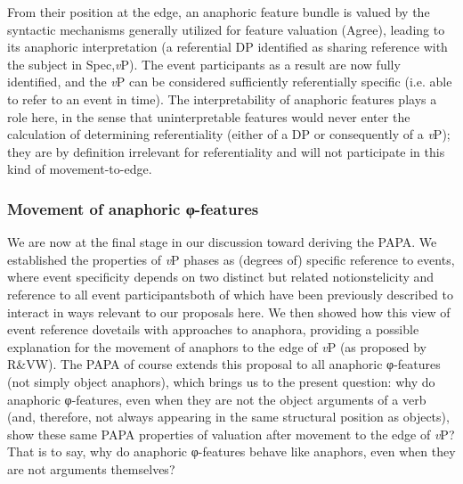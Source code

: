 \documentclass[output=paper
,modfonts
,nonflat
]{langsci/langscibook}
\begin{document}
From their position at the edge, an anaphoric feature bundle is valued by the syntactic mechanisms generally utilized for feature valuation (Agree), leading to its anaphoric interpretation (a referential DP identified as sharing reference with the subject in Spec,\textit{v}P). The event participants as a result are now fully identified, and the \textit{v}P can be considered sufficiently referentially specific (i.e. able to refer to an event in time). The interpretability of anaphoric features plays a role here, in the sense that uninterpretable features would never enter the calculation of determining referentiality (either of a DP or consequently of a \textit{v}P); they are by definition irrelevant for referentiality and will not participate in this kind of movement-to-edge.

\subsubsection{Movement of anaphoric φ-features}

We are now at the final stage in our discussion toward deriving the PAPA. We established the properties of \textit{v}P phases as (degrees of) specific reference to events, where event specificity depends on two distinct but related notions\textemdash telicity and reference to all event participants\textemdash both of which have been previously described to interact in ways relevant to our proposals here. We then showed how this view of event reference dovetails with approaches to anaphora, providing a possible explanation for the movement of anaphors to the edge of \textit{v}P (as proposed by R\&VW). The PAPA of course extends this proposal to all anaphoric φ-features (not simply object anaphors), which brings us to the present question: why do anaphoric φ-features, even when they are not the object arguments of a verb (and, therefore, not always appearing in the same structural position as objects), show these same PAPA properties of valuation after movement to the edge of \textit{v}P?  That is to say, why do anaphoric φ-features behave like anaphors, even when they are not arguments themselves?
\end{document}
